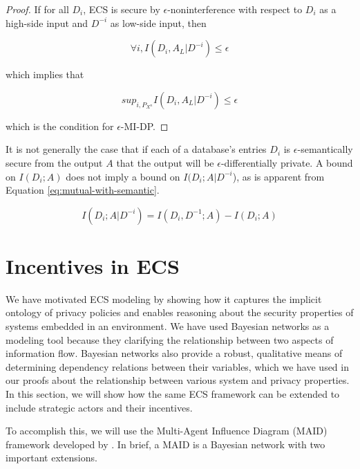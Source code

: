 \documentclass[../thesis.tex]{subfiles}
\begin{document}
\begin{center}
\end{center}
\begin{proof}
  If for all $D_i$,
  ECS is secure by $\epsilon$-noninterference with
  respect to $D_i$ as a high-side input and $D^{-i}$
  as low-side input,
  then
  
  $$\forall i, I(D_i, A_L \vert D^{-i}) \leq \epsilon$$

  which implies that

  $$sup_{i, P_{X^n}} I(D_i, A_L \vert D^{-i}) \leq \epsilon$$

  which is the condition for $\epsilon$-MI-DP.
\end{proof}


It is not generally the case that if
each of a database's entries $D_i$
is $\epsilon$-semantically secure
from the output $A$ that the output
will be $\epsilon$-differentially private.
A bound on $I(D_i;A)$ does not imply a
bound on $I(D_i; A \vert D^{-i}$), as
is apparent from Equation \ref{eq:mutual-with-semantic}.

\begin{equation}
  \label{eq:mutual-with-semantic}
  I(D_i;A \vert D^{-i}) = I(D_i,D^{-1}; A) - I(D_i;A)
\end{equation}

\section{Incentives in ECS}
\label{sec:incentives}

We have motivated ECS modeling by showing how it
captures the implicit ontology of privacy policies
and enables reasoning about the security properties
of systems embedded in an environment.
We have used Bayesian networks as a modeling tool
because they clarifying the relationship between
two aspects of information flow.
Bayesian networks also provide a robust, qualitative
means of determining dependency relations between their
variables, which we have used in our proofs about the
relationship between various system and privacy properties.
In this section, we will show how the same ECS framework
can be extended to include strategic actors and their incentives.

To accomplish this, we will use the Multi-Agent Influence Diagram
(MAID) framework developed by \citet{koller2003multi}.
In brief, a MAID is a Bayesian network with two important
extensions.
\end{document}
